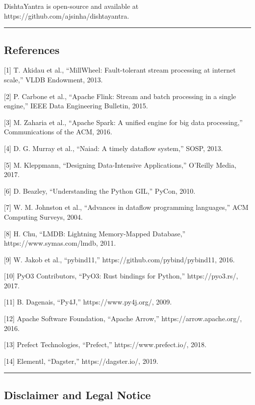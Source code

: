 \documentclass[
]{article}
\begin{document}
DishtaYantra is open-source and available at
https://github.com/ajsinha/dishtayantra.

\begin{center}\rule{0.5\linewidth}{0.5pt}\end{center}

\hypertarget{references}{%
\subsection{References}\label{references}}

{[}1{]} T. Akidau et al., ``MillWheel: Fault-tolerant stream processing
at internet scale,'' VLDB Endowment, 2013.

{[}2{]} P. Carbone et al., ``Apache Flink: Stream and batch processing
in a single engine,'' IEEE Data Engineering Bulletin, 2015.

{[}3{]} M. Zaharia et al., ``Apache Spark: A unified engine for big data
processing,'' Communications of the ACM, 2016.

{[}4{]} D. G. Murray et al., ``Naiad: A timely dataflow system,'' SOSP,
2013.

{[}5{]} M. Kleppmann, ``Designing Data-Intensive Applications,''
O'Reilly Media, 2017.

{[}6{]} D. Beazley, ``Understanding the Python GIL,'' PyCon, 2010.

{[}7{]} W. M. Johnston et al., ``Advances in dataflow programming
languages,'' ACM Computing Surveys, 2004.

{[}8{]} H. Chu, ``LMDB: Lightning Memory-Mapped Database,''
https://www.symas.com/lmdb, 2011.

{[}9{]} W. Jakob et al., ``pybind11,''
https://github.com/pybind/pybind11, 2016.

{[}10{]} PyO3 Contributors, ``PyO3: Rust bindings for Python,''
https://pyo3.rs/, 2017.

{[}11{]} B. Dagenais, ``Py4J,'' https://www.py4j.org/, 2009.

{[}12{]} Apache Software Foundation, ``Apache Arrow,''
https://arrow.apache.org/, 2016.

{[}13{]} Prefect Technologies, ``Prefect,'' https://www.prefect.io/,
2018.

{[}14{]} Elementl, ``Dagster,'' https://dagster.io/, 2019.

\begin{center}\rule{0.5\linewidth}{0.5pt}\end{center}

\hypertarget{disclaimer-and-legal-notice}{%
\subsection{Disclaimer and Legal
Notice}\label{disclaimer-and-legal-notice}}
\end{document}

